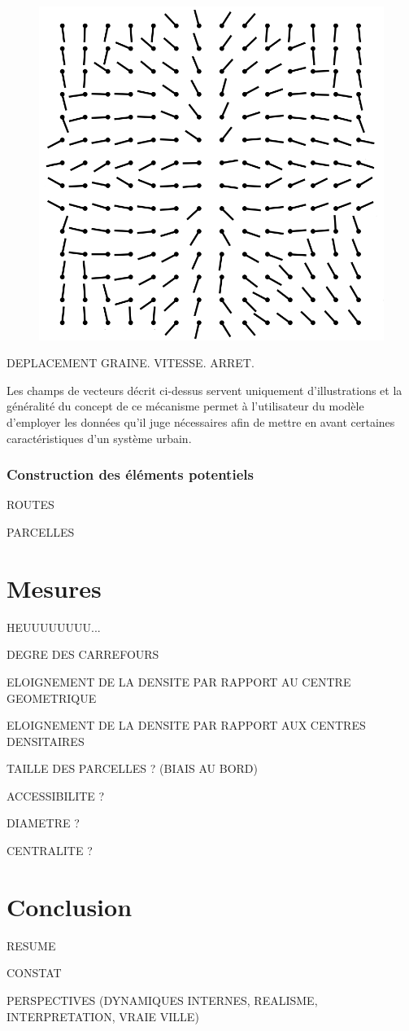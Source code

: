 \documentclass[12pt]{article}
\begin{document}
\begin{figure}[!ht]
  \centering
  \includegraphics[width=.8\linewidth]{images/vf-sum.png}
  \caption{}
  \label{fig:field-sum}
\end{figure}

DEPLACEMENT GRAINE. VITESSE. ARRET.

Les champs de vecteurs décrit ci-dessus servent uniquement
d'illustrations et la généralité du concept de ce mécanisme permet à
l'utilisateur du modèle d'employer les données qu'il juge nécessaires
afin de mettre en avant certaines caractéristiques d'un système
urbain.

\subsubsection{Construction des éléments potentiels}

ROUTES

PARCELLES

\section{Mesures}

HEUUUUUUUU...

DEGRE DES CARREFOURS

ELOIGNEMENT DE LA DENSITE PAR RAPPORT AU CENTRE GEOMETRIQUE

ELOIGNEMENT DE LA DENSITE PAR RAPPORT AUX CENTRES DENSITAIRES

TAILLE DES PARCELLES ? (BIAIS AU BORD)

ACCESSIBILITE ?

DIAMETRE ?

CENTRALITE ?

\section{Conclusion}

RESUME

CONSTAT

PERSPECTIVES (DYNAMIQUES INTERNES, REALISME, INTERPRETATION, VRAIE VILLE)

\printbibliography
\end{document}
